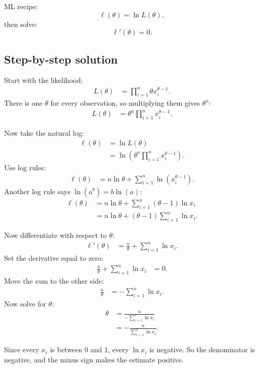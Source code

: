 \documentclass[11pt,a4paper]{article}
\begin{document}
ML recipe:
\[
\ell(\theta)=\ln L(\theta),
\]
then solve:
\[
\ell'(\theta)=0.
\]

\subsection*{Step-by-step solution}
Start with the likelihood:
\begin{align*}
L(\theta)
&=\prod_{i=1}^n \theta x_i^{\theta-1}.
\end{align*}
There is one \(\theta\) for every observation, so multiplying them gives \(\theta^n\):
\begin{align*}
L(\theta)
&=\theta^n\prod_{i=1}^n x_i^{\theta-1}.
\end{align*}

Now take the natural log:
\begin{align*}
\ell(\theta)
&=\ln L(\theta)\\
&=\ln\left(\theta^n\prod_{i=1}^n x_i^{\theta-1}\right).
\end{align*}
Use log rules:
\begin{align*}
\ell(\theta)
&=n\ln\theta+\sum_{i=1}^n \ln\left(x_i^{\theta-1}\right).
\end{align*}
Another log rule says \(\ln(a^b)=b\ln(a)\):
\begin{align*}
\ell(\theta)
&=n\ln\theta+\sum_{i=1}^n(\theta-1)\ln x_i\\
&=n\ln\theta+(\theta-1)\sum_{i=1}^n \ln x_i.
\end{align*}

Now differentiate with respect to \(\theta\):
\begin{align*}
\ell'(\theta)
&=\frac{n}{\theta}+\sum_{i=1}^n \ln x_i.
\end{align*}
Set the derivative equal to zero:
\begin{align*}
\frac{n}{\theta}+\sum_{i=1}^n \ln x_i&=0.
\end{align*}
Move the sum to the other side:
\begin{align*}
\frac{n}{\theta}&=-\sum_{i=1}^n \ln x_i.
\end{align*}
Now solve for \(\theta\):
\begin{align*}
\theta
&=\frac{n}{-\sum_{i=1}^n \ln x_i}\\
&=-\frac{n}{\sum_{i=1}^n \ln x_i}.
\end{align*}

Since every \(x_i\) is between \(0\) and \(1\), every \(\ln x_i\) is negative. So the denominator is negative, and the minus sign makes the estimate positive.
\end{document}

